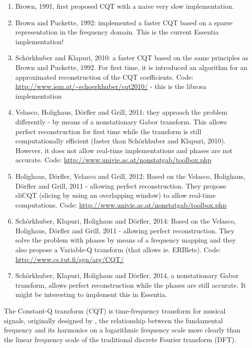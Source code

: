 \documentclass[report.tex]{subfiles}
\begin{document}
\begin{enumerate}
	\item
	    Brown, 1991, first proposed CQT with a naive very slow implementation.
    \item
	    Brown and Puckette, 1992: implemented a faster CQT based on a sparse representation in the frequency domain. This is the current Essentia implementation!
    \item
	    Sch{\"o}rkhuber and Klapuri, 2010: a faster CQT based on the same principles as Brown and Puckette, 1992. For first time, it is introduced an algorithm for an approximated reconstruction of the CQT coefficients. Code: \url{http://www.iem.at/~schoerkhuber/cqt2010/} - this is the librosa implementation
    \item
	    Velasco, Holighaus, D{\"o}rfler and Grill, 2011: they approach the problem differently - by means of a nonstationary Gabor transform. This allows perfect reconstruction for first time while the transform is still computationally efficient (faster than Sch{\"o}rkhuber and Klapuri, 2010). However, it does not allow real-time implementations and phases are not accurate. Code: \url{http://www.univie.ac.at/nonstatgab/toolbox.php}
    \item
	    Holighaus, D{\"o}rfler, Velasco and Grill, 2012: Based on the Velasco, Holighaus, Dörfler and Grill, 2011 - allowing perfect reconstruction. They propose sliCQT (slicing by using an overlapping window) to allow real-time computations. Code: \url{http://www.univie.ac.at/nonstatgab/toolbox.php}
    \item
	    Sch{\"o}rkhuber, Klapuri, Holighaus and Dörfler, 2014: Based on the Velasco, Holighaus, Dörfler and Grill, 2011 - allowing perfect reconstruction. They solve the problem with phases by means of a frequency mapping and they also propose a Variable-Q transform (that allows ie. ERBlets). Code: \url{http://www.cs.tut.fi/sgn/arg/CQT/}
    \item
	    Sch{\"o}rkhuber, Klapuri, Holighaus and D{\"o}rfler, 2014, a nonstationary Gabor transform, allows perfect reconstruction while the phases are still accurate. It might be interesting to implement this in Essentia.
\end{enumerate}


The Constant-Q transform (CQT) is time-frequency transform for musical signals, originally designed by \textcite{jbrown}, the relationship between the fundamental frequency and its harmonics on a logarithmic frequency scale more clearly than the linear frequency scale of the traditional discrete Fourier transform (DFT).
\end{document}

